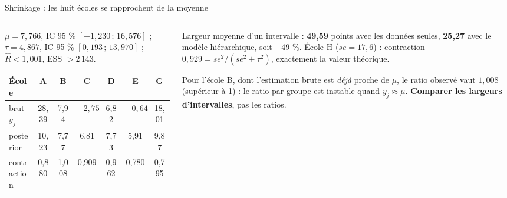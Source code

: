 \begin{frame}{Shrinkage : les huit écoles se rapprochent de la moyenne}

\vspace{-1mm}
\begin{columns}[t]
\begin{column}{0.55\textwidth}
\begin{ebox}
$\mu = 7{,}766$, IC 95 \% $[-1{,}230 \,;\, 16{,}576]$ \;;\;
$\tau = 4{,}867$, IC 95 \% $[0{,}193 \,;\, 13{,}970]$ \; ;\;
$\hat R < 1{,}001$, ESS $> 2\,143$.
\end{ebox}
\begin{tabular}{@{}lcccccc@{}}
\toprule
\textbf{École} & A & B & C & D & E & G \\
\midrule
brut $y_j$ & 28,39 & 7,94 & $-2{,}75$ & 6,82 & $-0{,}64$ & 18,01 \\
posterior & 10,23 & 7,77 & 6,81 & 7,73 & 5,91 & 9,87 \\
contraction & 0,880 & 1,008 & 0,909 & 0,962 & 0,780 & 0,795 \\
\bottomrule
\end{tabular}
\end{column}
\begin{column}{0.42\textwidth}
\begin{kbox}
Largeur moyenne d'un intervalle : \textbf{49,59} points avec les données seules,
\textbf{25,27} avec le modèle hiérarchique, soit $-49$ \%. École H
($se = 17{,}6$) : contraction $0{,}929 = se^2/(se^2+\tau^2)$, exactement la
valeur théorique.
\end{kbox}
\begin{wbox}
Pour l'école B, dont l'estimation brute est \emph{déjà} proche de $\mu$, le ratio
observé vaut $1{,}008$ (supérieur à 1) : le ratio par groupe est instable quand
$y_j \approx \mu$. \textbf{Comparer les largeurs d'intervalles}, pas les ratios.
\end{wbox}
\end{column}
\end{columns}
\end{frame}

